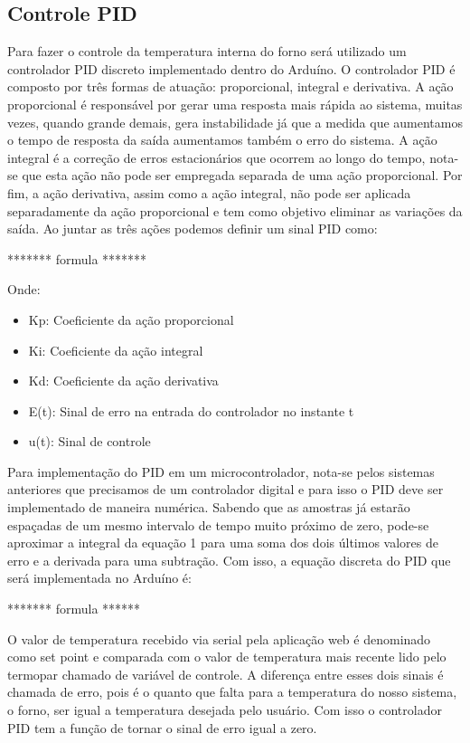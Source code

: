 \subsection{Controle PID}
Para fazer o controle da temperatura interna do forno será utilizado um controlador PID discreto implementado dentro do Arduíno. O controlador PID é composto por três formas de atuação: proporcional, integral e derivativa. A ação proporcional é responsável por gerar uma resposta mais rápida ao sistema, muitas vezes, quando grande demais, gera instabilidade já que a medida que aumentamos o tempo de resposta da saída aumentamos também o erro do sistema. A ação integral é a correção de erros estacionários que ocorrem ao longo do tempo, nota-se que esta ação não pode ser empregada separada de uma ação proporcional. Por fim, a ação derivativa, assim como a ação integral, não pode ser aplicada separadamente da ação proporcional e tem como objetivo eliminar as variações da saída. Ao juntar as três ações podemos definir um sinal PID como:

*******
formula
*******

Onde:

\begin{itemize}
	\item Kp: Coeficiente da ação proporcional
	\item Ki: Coeficiente da ação integral
	\item Kd: Coeficiente da ação derivativa
	\item E(t): Sinal de erro na entrada do controlador no instante t
	\item u(t): Sinal de controle	
\end{itemize}

Para implementação do PID em um microcontrolador, nota-se pelos sistemas anteriores que precisamos de um controlador digital e para isso o PID deve ser implementado de maneira numérica. Sabendo que as amostras já estarão espaçadas de um mesmo intervalo de tempo muito próximo de zero, pode-se aproximar a integral da equação 1 para uma soma dos dois últimos valores de erro e a derivada para uma subtração. Com isso, a equação discreta do PID que será implementada no Arduíno é:

*******
formula
******

O valor de temperatura recebido via serial pela aplicação web é denominado como set point e comparada com o valor de temperatura mais recente lido pelo termopar chamado de variável de controle. A diferença entre esses dois sinais é chamada de erro, pois é o quanto que falta para a temperatura do nosso sistema, o forno, ser igual a temperatura desejada pelo usuário. Com isso o controlador PID tem a função de tornar o sinal de erro igual a zero.

